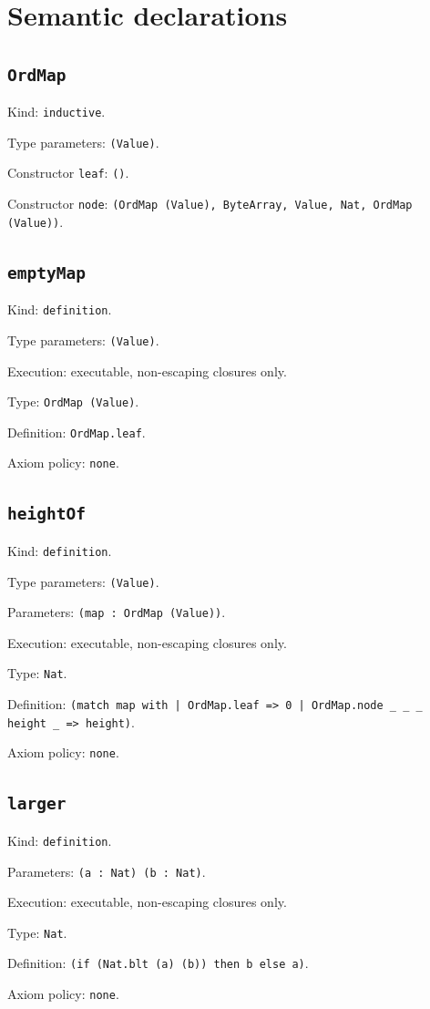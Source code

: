 \documentclass[11pt]{article}
\begin{document}
\section*{Semantic declarations}
\subsection*{\texttt{OrdMap}}
\noindent Kind: \texttt{inductive}.\par
\noindent Type parameters: \texttt{(Value)}.\par
\noindent Constructor \texttt{leaf}: \texttt{()}.\par
\noindent Constructor \texttt{node}: \texttt{(OrdMap (Value), ByteArray, Value, Nat, OrdMap (Value))}.\par
\subsection*{\texttt{emptyMap}}
\noindent Kind: \texttt{definition}.\par
\noindent Type parameters: \texttt{(Value)}.\par
\noindent Execution: executable, non-escaping closures only.\par
\noindent Type: \texttt{OrdMap (Value)}.\par
\noindent Definition: \texttt{OrdMap.leaf}.\par
\noindent Axiom policy: \texttt{none}.\par
\subsection*{\texttt{heightOf}}
\noindent Kind: \texttt{definition}.\par
\noindent Type parameters: \texttt{(Value)}.\par
\noindent Parameters: \texttt{(map : OrdMap (Value))}.\par
\noindent Execution: executable, non-escaping closures only.\par
\noindent Type: \texttt{Nat}.\par
\noindent Definition: \texttt{(match map with | OrdMap.leaf => 0 | OrdMap.node \_ \_ \_ height \_ => height)}.\par
\noindent Axiom policy: \texttt{none}.\par
\subsection*{\texttt{larger}}
\noindent Kind: \texttt{definition}.\par
\noindent Parameters: \texttt{(a : Nat) (b : Nat)}.\par
\noindent Execution: executable, non-escaping closures only.\par
\noindent Type: \texttt{Nat}.\par
\noindent Definition: \texttt{(if (Nat.blt (a) (b)) then b else a)}.\par
\noindent Axiom policy: \texttt{none}.\par
\end{document}
